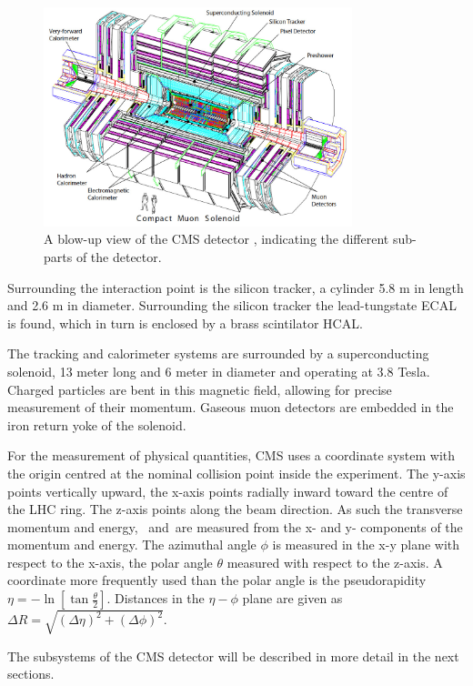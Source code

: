 \begin{figure}[h!]
\includegraphics[width=0.8\textwidth]{./Detector/Plots/cms.png}
\caption{A blow-up view of the \ac{CMS} detector \cite{cms-jinst}, indicating the
different sub-parts of the detector.}
\label{fig:cms_detector}
\end{figure}

Surrounding the interaction point is the silicon tracker, a cylinder 5.8 m in length and 2.6 m in 
diameter. Surrounding the silicon tracker
the lead-tungstate \ac{ECAL} is found, which in turn is enclosed
by a brass scintilator \ac{HCAL}. 

The tracking and calorimeter systems are surrounded by a superconducting
solenoid, 13 meter long and 6 meter in diameter and operating at 3.8 Tesla.
Charged particles are bent in this magnetic field, allowing for precise 
measurement of their momentum. Gaseous muon detectors are embedded in the 
iron return yoke of the solenoid.

For the measurement of physical quantities, \ac{CMS} uses a coordinate
system with the origin centred at the nominal collision point
inside the experiment. The y-axis points vertically upward, the x-axis
points radially inward toward the centre of the \ac{LHC} ring. The z-axis
points along the beam direction. As such the transverse momentum and energy, 
\pT~and~\ET are measured from the x- and y- components of the momentum and energy.
The azimuthal angle $\phi$ is measured in the x-y plane with respect to the x-axis, 
the polar angle $\theta$ measured with respect to the z-axis. A coordinate
more frequently used than the polar angle is the pseudorapidity $\eta = -\ln{[\tan{\frac{\theta}{2}}]}$.
Distances in the $\eta-\phi$ plane are given as $\Delta R = \sqrt{(\Delta\eta)^2+(\Delta\phi)^2}$. 

The subsystems of the \ac{CMS} detector will be described in more detail in the 
next sections.


